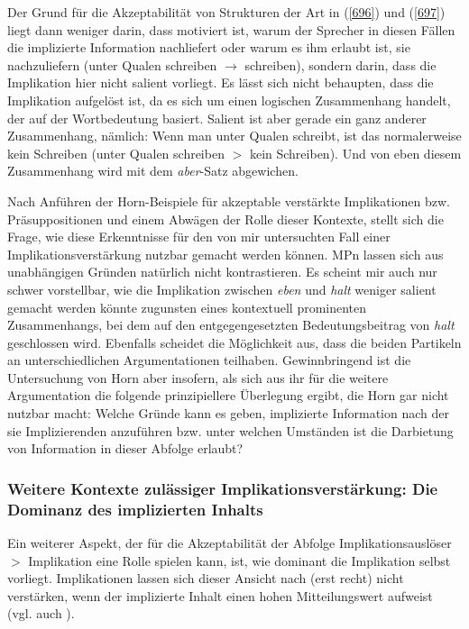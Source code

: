 Der Grund für die Akzeptabilität von Strukturen der Art in (\ref{696}) und (\ref{697}) liegt dann weniger darin, dass motiviert ist, warum der Sprecher in diesen Fällen die implizierte Information nachliefert oder warum es ihm erlaubt ist, sie nachzulie\-fern (unter Qualen schreiben $\rightarrow$ schreiben), sondern darin, dass die Implikation hier nicht salient vorliegt. Es lässt sich nicht behaupten, dass die Implikation aufgelöst ist, da es sich um einen logischen Zusammenhang handelt, der auf der Wortbedeutung basiert. Salient ist aber gerade ein ganz anderer Zusammenhang, nämlich: Wenn man unter Qualen schreibt, ist das normalerweise kein Schreiben (unter Qualen schreiben $>$ kein Schreiben). Und von eben diesem Zusammenhang wird mit dem \textit{aber}-Satz abgewichen.

Nach Anführen der Horn-Beispiele für akzeptable verstärkte Implikationen bzw. Präsuppositionen und einem Abwägen der Rolle dieser Kontexte, stellt sich die Frage, wie diese Erkenntnisse für den von mir untersuchten Fall einer Implikationsverstärkung nutzbar gemacht werden können. MPn lassen sich aus unabhängigen Gründen natürlich nicht kontrastieren. Es scheint mir auch nur schwer vorstellbar, wie die Implikation zwischen \textit{eben} und \textit{halt} weniger salient gemacht werden könnte zugunsten eines kontextuell prominenten Zusammenhangs, bei dem auf den entgegengesetzten Bedeutungsbeitrag von \textit{halt} geschlossen wird. Ebenfalls scheidet die Möglichkeit aus, dass die beiden Partikeln an unterschiedli\-chen Argumentationen teilhaben. Gewinnbringend ist die Untersuchung von Horn aber insofern, als sich aus ihr für die weitere Argumentation die folgende prinzipiellere Überlegung ergibt, die Horn gar nicht nutzbar macht: Welche Grün\-de kann es geben, implizierte Information nach der sie Implizierenden anzuführen bzw. unter welchen Umständen ist die Darbietung von Information in dieser Abfolge erlaubt?

\subsubsection{Weitere Kontexte zulässiger Implikationsverstärkung: Die Dominanz des implizierten Inhalts}
Ein weiterer Aspekt, der für die Akzeptabilität der Abfolge Implikationsauslöser $>$ Implikation eine Rolle spielen kann, ist, wie dominant die Implikation selbst vorliegt. Implikationen lassen sich dieser Ansicht nach (erst recht) nicht verstärken, wenn der implizierte Inhalt einen hohen Mitteilungswert aufweist (vgl. auch \citealt[165-166]{Mueller2016a}).
	
